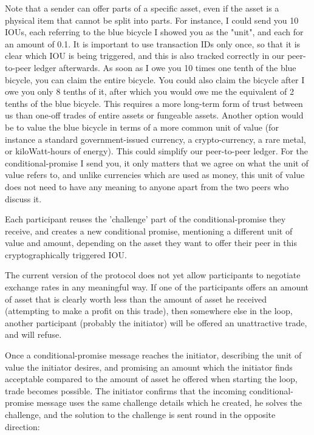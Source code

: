 \documentclass[11pt,twoside,a4paper]{article}
\begin{document}
Note that a sender can offer parts of a specific asset, even if the asset is a physical item that cannot be split into parts.
For instance, I could send you 10 IOUs, each referring to the blue bicycle I showed you as the "unit", and each for an amount of 0.1.
It is important to use transaction IDs only once, so that it is clear which IOU is being triggered, and this is also tracked
correctly in our peer-to-peer ledger afterwards. As soon as I owe you 10 times one tenth of the blue bicycle, you can claim the
entire bicycle. You could also claim the bicycle after I owe you only 8 tenths of it, after which you would owe me the equivalent
of 2 tenths of the blue bicycle. This requires a more long-term form of trust between us than one-off trades of entire assets or
fungeable assets. Another option would be to value the blue bicycle in terms of a more common unit of value (for instance a standard
government-issued currency, a crypto-currency, a rare metal, or kiloWatt-hours of energy). This could simplify our peer-to-peer ledger.
For the conditional-promise I send you, it only matters that we agree on what the unit of value refers to, and unlike currencies which are
used as money, this unit of value does not need to have any meaning to anyone apart from the two peers who discuss it.

Each participant reuses the 'challenge' part of the conditional-promise they receive, and creates a new conditional promise, mentioning
a different unit of value and amount, depending on the asset they want to offer their peer in this cryptographically triggered IOU.

The current version of the protocol does not yet allow participants to negotiate exchange rates in any meaningful way.
If one of the participants offers an
amount of asset that is clearly worth less than the amount of asset he received (attempting to make a profit on this trade), then somewhere
else in the loop, another participant (probably the initiator) will be offered an unattractive trade, and will refuse.

Once a conditional-promise message reaches the initiator, describing the unit of value the initiator desires, and promising an amount which the initiator finds acceptable compared to the amount of asset he offered when starting the loop, trade becomes possible. The initiator confirms that the incoming conditional-promise message uses the same challenge
details which he created, he solves the challenge, and the solution to the challenge is sent round in the opposite direction:
\end{document}
